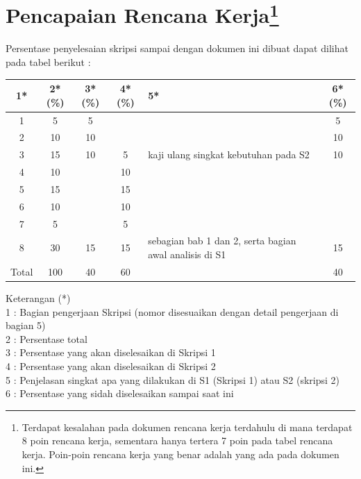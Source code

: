 \documentclass[a4paper,twoside]{article}
\begin{document}
\pagebreak

\section{Pencapaian Rencana Kerja\footnote{Terdapat kesalahan pada dokumen rencana kerja terdahulu di mana terdapat 8 poin rencana kerja, sementara hanya tertera 7 poin pada tabel rencana kerja. Poin-poin rencana kerja yang benar adalah yang ada pada dokumen ini.}}

Persentase penyelesaian skripsi sampai dengan dokumen ini dibuat dapat dilihat pada tabel berikut :

\begin{center}
  \begin{tabular}{ | c | c | c | c | l | c |}
    \hline
    1*  & 2*(\%) & 3*(\%) & 4*(\%) &5* &6*(\%)\\ \hline \hline
    1   & 5  & 5  &  &  & 5 \\ \hline
    2   & 10 & 10  &   &  & 10 \\ \hline
    3   & 15  & 10  & 5 & {\footnotesize kaji ulang singkat kebutuhan pada S2}  & 10  \\ \hline
    4   & 10  &  & 10 &  & \\ \hline
    5   & 15  &   & 15 & & \\ \hline
    6   & 10 &   & 10  & & \\ \hline
    7   & 5 &   & 5  & & \\ \hline
    8   & 30  & 15  & 15 & {\footnotesize sebagian bab 1 dan 2, serta bagian awal analisis di S1} & 15 \\ \hline
    Total  & 100  & 40  & 60 &  & 40\\ \hline
                          \end{tabular}
\end{center}

Keterangan (*)\\
1 : Bagian pengerjaan Skripsi (nomor disesuaikan dengan detail pengerjaan di bagian 5)\\
2 : Persentase total \\
3 : Persentase yang akan diselesaikan di Skripsi 1 \\
4 : Persentase yang akan diselesaikan di Skripsi 2 \\
5 : Penjelasan singkat apa yang dilakukan di S1 (Skripsi 1) atau S2 (skripsi 2)\\
6 : Persentase yang sidah diselesaikan sampai saat ini
\end{document}
